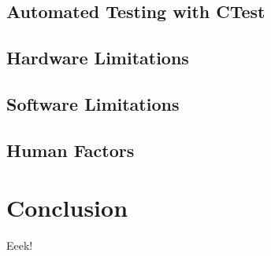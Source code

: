 \documentclass[MSc,paper=a4,pagesize=auto]{icldt}
\begin{document}
\section{Automated Testing with CTest}
\section{Hardware Limitations}
\section{Software Limitations}
\section{Human Factors}


\chapter{Conclusion}
Eeek!

	
\end{document}
